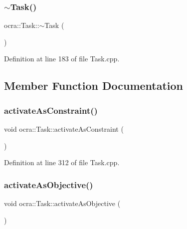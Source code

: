\hypertarget{classocra_1_1Task_a3949d2c52bc43f373b8cc039da304b87}{}\label{classocra_1_1Task_a3949d2c52bc43f373b8cc039da304b87} 
\subsubsection{\texorpdfstring{$\sim$\+Task()}{~Task()}}
{\footnotesize\ttfamily ocra\+::\+Task\+::$\sim$\+Task (\begin{DoxyParamCaption}{ }\end{DoxyParamCaption})\hspace{0.3cm}{\ttfamily [virtual]}}



Definition at line 183 of file Task.\+cpp.



\subsection{Member Function Documentation}
\hypertarget{classocra_1_1Task_a4f7b62e14ba71899991eaf4522d31a90}{}\label{classocra_1_1Task_a4f7b62e14ba71899991eaf4522d31a90} 
\subsubsection{\texorpdfstring{activate\+As\+Constraint()}{activateAsConstraint()}}
{\footnotesize\ttfamily void ocra\+::\+Task\+::activate\+As\+Constraint (\begin{DoxyParamCaption}{ }\end{DoxyParamCaption})}



Definition at line 312 of file Task.\+cpp.

\hypertarget{classocra_1_1Task_a30cf51c067e6bac56a7b2184fa880bbe}{}\label{classocra_1_1Task_a30cf51c067e6bac56a7b2184fa880bbe} 
\subsubsection{\texorpdfstring{activate\+As\+Objective()}{activateAsObjective()}}
{\footnotesize\ttfamily void ocra\+::\+Task\+::activate\+As\+Objective (\begin{DoxyParamCaption}{ }\end{DoxyParamCaption})}



